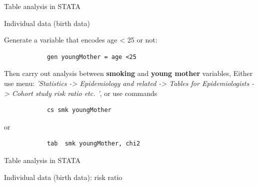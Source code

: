 \documentclass[compress, notes=hide]{beamer}
\begin{document}
\begin{frame}[fragile]{Table analysis in STATA}
	\begin{block}{Individual data (birth data)}
		
		Generate a variable that encodes age < 25 or not: 
		\begin{verbatim}
			gen youngMother = age <25
		\end{verbatim} 
		
		Then carry out analysis between \textbf{smoking} and \textbf{young mother} variables, 
		\vspace{0.2cm}
		Either  use menu: \emph{'Statistics -> Epidemiology and related -> Tables for Epidemiologists -> Cohort study risk  ratio etc. '}, or use commands
		\begin{verbatim}
			cs smk youngMother
		\end{verbatim}  
		or \begin{verbatim}
			tab  smk youngMother, chi2
		\end{verbatim}
		
	\end{block}
\end{frame}





\begin{frame}[fragile]{Table analysis in STATA}
	\begin{block}{Individual data (birth data): risk ratio}
		
		\begin{figure}[H]
			\begin{center}
				{}
			\end{center}
		\end{figure}
		
		
	\end{block}
\end{frame}
\end{document}
